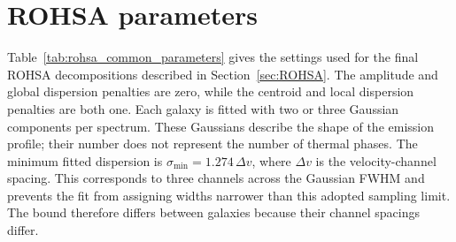 

\chapter[ROHSA parameters]{ROHSA parameters}
\label{app:rohsa}

Table~\ref{tab:rohsa_common_parameters} gives the settings used for the final ROHSA decompositions described in Section~\ref{sec:ROHSA}. The amplitude and global dispersion penalties are zero, while the centroid and local dispersion penalties are both one. Each galaxy is fitted with two or three Gaussian components per spectrum. These Gaussians describe the shape of the emission profile; their number does not represent the number of thermal phases. The minimum fitted dispersion is $\sigma_{\min}=1.274\,\Delta v$, where $\Delta v$ is the velocity-channel spacing. This corresponds to three channels across the Gaussian FWHM and prevents the fit from assigning widths narrower than this adopted sampling limit. The bound therefore differs between galaxies because their channel spacings differ.


